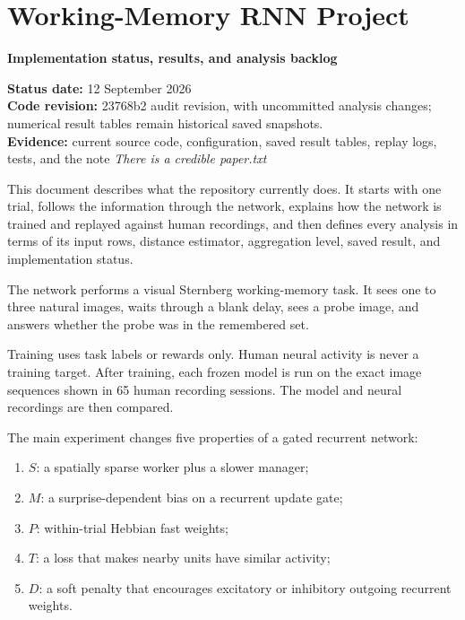 \documentclass[
  10pt,
]{article}
\author{}
\date{}
\providecommand{\tightlist}{%
  \setlength{\itemsep}{0pt}\setlength{\parskip}{0pt}}
\begin{document}
{
\setcounter{tocdepth}{3}
\tableofcontents
}
\hypertarget{working-memory-rnn-project}{%
\section{Working-Memory RNN Project}\label{working-memory-rnn-project}}

\textbf{Implementation status, results, and analysis backlog}

\textbf{Status date:} 12 September 2026\\
\textbf{Code revision:} 23768b2 audit revision, with uncommitted
analysis changes; numerical result tables remain historical saved
snapshots.\\
\textbf{Evidence:} current source code, configuration, saved result
tables, replay logs, tests, and the note \emph{There is a credible
paper.txt}

This document describes what the repository currently does. It starts
with one trial, follows the information through the network, explains
how the network is trained and replayed against human recordings, and
then defines every analysis in terms of its input rows, distance
estimator, aggregation level, saved result, and implementation status.

The network performs a visual Sternberg working-memory task. It sees one
to three natural images, waits through a blank delay, sees a probe
image, and answers whether the probe was in the remembered set.

Training uses task labels or rewards only. Human neural activity is
never a training target. After training, each frozen model is run on the
exact image sequences shown in 65 human recording sessions. The model
and neural recordings are then compared.

The main experiment changes five properties of a gated recurrent
network:

\begin{enumerate}
\def\labelenumi{\arabic{enumi}.}
\tightlist
\item
  \(S\): a spatially sparse worker plus a slower manager;
\item
  \(M\): a surprise-dependent bias on a recurrent update gate;
\item
  \(P\): within-trial Hebbian fast weights;
\item
  \(T\): a loss that makes nearby units have similar activity;
\item
  \(D\): a soft penalty that encourages excitatory or inhibitory
  outgoing recurrent weights.
\end{enumerate}
\end{document}
